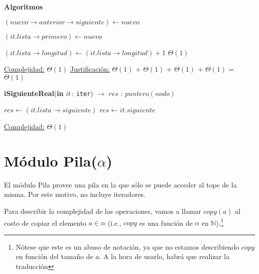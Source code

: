 \documentclass[a4paper,10pt]{article}
\let\TipoVariable=\texttt
\let\ModificadorArgumento=\textbf
\newcommand{\In}[2]{\ModificadorArgumento{in} \ensuremath{#1}\,: \TipoVariable{#2}\xspace}
\newenvironment{Algoritmos}{%
  \vspace*{2ex}%
  \noindent\textbf{\Large Algoritmos}%
  \vspace*{2ex}%
}{}
\begin{document}
\begin{Algoritmos}
\begin{algorithm}[H]
\begin{algorithmic}[1]
			\State $(nuevo\rightarrow anterior\rightarrow siguiente) \gets nuevo$ 
			
				\State $(it.lista\rightarrow primero) \gets nuevo$
			\EndIf
			
			\State $(it.lista\rightarrow longitud) \gets (it.lista\rightarrow longitud) + 1$	\Comment $\Theta(1)$

			\medskip
			\Statex \underline{Complejidad:} $\Theta(1)$
			\Statex \underline{Justificación:} $\Theta(1)$ + $\Theta(1)$ + $\Theta(1)$ +  $\Theta(1)$ =  $\Theta(1)$
    	\end{algorithmic}
\end{algorithm}

	
\begin{algorithm}[H]
	\begin{algorithmic}
		\State \textbf{iSiguienteReal}(\In{it}{iter}) $\to$ $res$ : $puntero(nodo)$ 
			
			 
				\State $res \gets (it.lista\rightarrow siguiente)$
			\Else
				\State $res \gets it.siguiente$
			\EndIf
			
			\medskip
			\Statex \underline{Complejidad:} $\Theta(1)$
    	\end{algorithmic}
\end{algorithm}
%    
	
\end{Algoritmos}

\newpage

\section{Módulo Pila($\alpha$)}

El módulo Pila provee una pila en la que sólo se puede acceder al tope de la misma.  Por este motivo, no incluye iteradores.

Para describir la complejidad de las operaciones, vamos a llamar $copy(a)$ al costo de copiar el elemento $a \in \alpha$ (i.e., $copy$ es una función de $\alpha$ en $\mathbb{N}$).\footnote{Nótese que este es un abuso de notación, ya que no estamos describiendo $copy$ en función del tamaño de $a$.  A la hora de usarlo, habrá que realizar la traducción}
\end{document}
